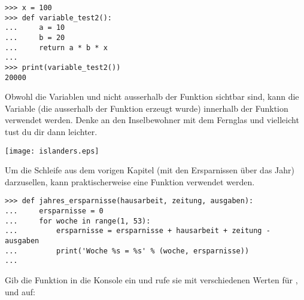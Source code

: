 \begin{Verbatim}[frame=single]
>>> x = 100
>>> def variable_test2():
...     a = 10
...     b = 20
...     return a * b * x
...
>>> print(variable_test2())
20000
\end{Verbatim}

Obwohl die Variablen  und  nicht ausserhalb der Funktion sichtbar sind, kann die Variable  (die ausserhalb der Funktion erzeugt wurde) innerhalb der Funktion verwendet werden. Denke an den Inselbewohner mit dem Fernglas und vielleicht tust du dir dann leichter.

\begin{center}
\texttt{[image: islanders.eps]}
\end{center}

Um die Schleife aus dem vorigen Kapitel (mit den Ersparnissen über das Jahr) darzusellen, kann praktischerweise eine Funktion verwendet werden.

\begin{Verbatim}[frame=single]
>>> def jahres_ersparnisse(hausarbeit, zeitung, ausgaben):
...     ersparnisse = 0
...     for woche in range(1, 53):
...         ersparnisse = ersparnisse + hausarbeit + zeitung - ausgaben
...         print('Woche %s = %s' % (woche, ersparnisse))
...
\end{Verbatim}

Gib die Funktion in die Konsole ein und rufe sie mit verschiedenen Werten für ,  und  auf:

